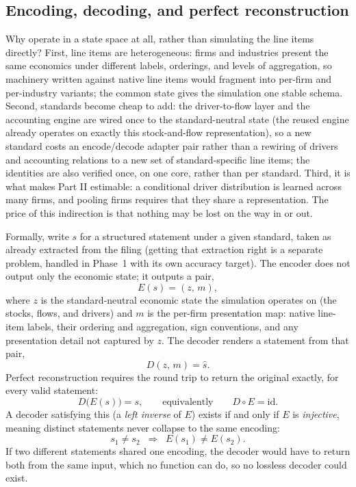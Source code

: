 \documentclass[11pt]{article}
\begin{document}
\subsection{Encoding, decoding, and perfect reconstruction}
\label{sec:reconstruction}
Why operate in a state space at all, rather than simulating the line items directly? First, line items are heterogeneous: firms and industries present the same economics under different labels, orderings, and levels of aggregation, so machinery written against native line items would fragment into per-firm and per-industry variants; the common state gives the simulation one stable schema. Second, standards become cheap to add: the driver-to-flow layer and the accounting engine are wired once to the standard-neutral state (the reused engine already operates on exactly this stock-and-flow representation), so a new standard costs an encode/decode adapter pair rather than a rewiring of drivers and accounting relations to a new set of standard-specific line items; the identities are also verified once, on one core, rather than per standard. Third, it is what makes Part II estimable: a conditional driver distribution is learned across many firms, and pooling firms requires that they share a representation. The price of this indirection is that nothing may be lost on the way in or out.

Formally, write $s$ for a structured statement under a given standard, taken as already extracted from the filing (getting that extraction right is a separate problem, handled in Phase~1 with its own accuracy target). The encoder does not output only the economic state; it outputs a pair,
\begin{equation} E(s) = (z,\, m), \end{equation}
where $z$ is the standard-neutral economic state the simulation operates on (the stocks, flows, and drivers) and $m$ is the per-firm presentation map: native line-item labels, their ordering and aggregation, sign conventions, and any presentation detail not captured by $z$. The decoder renders a statement from that pair,
\begin{equation} D(z,\, m) = \hat{s}. \end{equation}
Perfect reconstruction requires the round trip to return the original exactly, for every valid statement:
\begin{equation} D\big(E(s)\big) = s, \qquad\text{equivalently}\qquad D \circ E = \mathrm{id}. \end{equation}
A decoder satisfying this (a \emph{left inverse} of $E$) exists if and only if $E$ is \emph{injective}, meaning distinct statements never collapse to the same encoding:
\begin{equation} s_1 \neq s_2 \;\;\Longrightarrow\;\; E(s_1) \neq E(s_2). \end{equation}
If two different statements shared one encoding, the decoder would have to return both from the same input, which no function can do, so no lossless decoder could exist.
\end{document}
